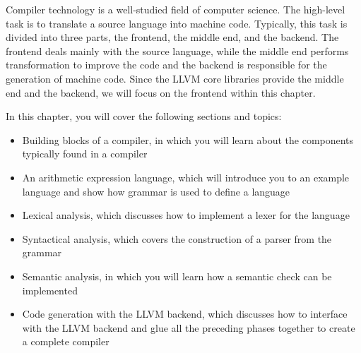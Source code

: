 Compiler technology is a well-studied field of computer science. The high-level task is to translate a source language into machine code. Typically, this task is divided into three parts, the frontend, the middle end, and the backend. The frontend deals mainly with the source language, while the middle end performs transformation to improve the code and the backend is responsible for the generation of machine code. Since the LLVM core libraries provide the middle end and the backend, we will focus on the frontend within this chapter.

In this chapter, you will cover the following sections and topics:

\begin{itemize}
\item 
Building blocks of a compiler, in which you will learn about the components typically found in a compiler

\item 
An arithmetic expression language, which will introduce you to an example language and show how grammar is used to define a language

\item 
Lexical analysis, which discusses how to implement a lexer for the language

\item 
Syntactical analysis, which covers the construction of a parser from the grammar

\item 
Semantic analysis, in which you will learn how a semantic check can be implemented

\item 
Code generation with the LLVM backend, which discusses how to interface with the LLVM backend and glue all the preceding phases together to create a complete compiler
\end{itemize}












